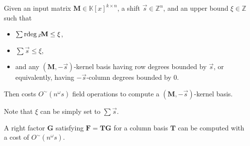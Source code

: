 \begin{lem}
\label{lem:costKernelBasisReverse}Given an input matrix $\mathbf{M}\in\mathbb{K}\left[x\right]^{k\times n}$,
a shift $\vec{s}\in\mathbb{Z}^{n}$, and an upper bound $\xi\in\mathbb{Z}$
such that 
\begin{itemize}
\item $\sum{\rm rdeg}\,_{\vec{s}}\mathbf{M}\le\xi$,
\item $\sum\vec{s}\le\xi$,
\item and any $\left(\mathbf{M},-\vec{s}\right)$-kernel basis having row
degrees bounded by $\vec{s}$, or equivalently, having $-\vec{s}$-column
degrees bounded by 0.
\end{itemize}
Then  costs $O^{\sim}\left(n^{\omega}s\right)$
field operations to compute a $\left(\mathbf{M},-\vec{s}\right)$-kernel
basis.

Note that $\xi$ can be simply set to $\sum\vec{s}$.\end{lem}
\begin{thm}
A right factor $\mathbf{G}$ satisfying $\mathbf{F}=\mathbf{TG}$
for a column basis $\mathbf{T}$ can be computed with a cost of $O^{\sim}\left(n^{\omega}s\right)$. \end{thm}

